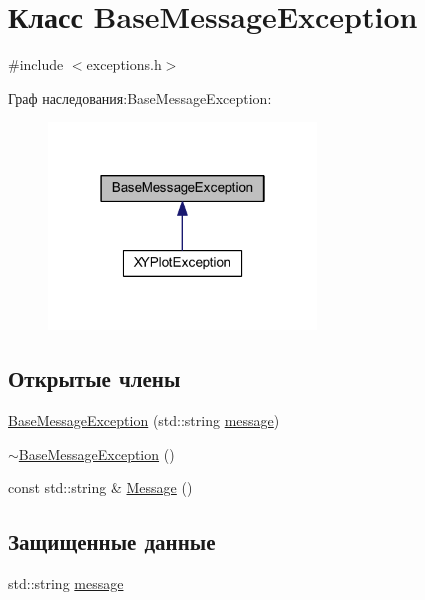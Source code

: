 \hypertarget{class_base_message_exception}{\section{Класс Base\-Message\-Exception}
\label{class_base_message_exception}
}


{\ttfamily \#include $<$exceptions.\-h$>$}



Граф наследования\-:Base\-Message\-Exception\-:
\nopagebreak
\begin{figure}[H]
\begin{center}
\leavevmode
\includegraphics[width=202pt]{class_base_message_exception__inherit__graph}
\end{center}
\end{figure}
\subsection*{Открытые члены}
\begin{DoxyCompactItemize}
\item 
\hyperlink{class_base_message_exception_a61b9dad6f5b44ac8e3012e8b9af75ddf}{Base\-Message\-Exception} (std\-::string \hyperlink{class_base_message_exception_adbf18cd63b2f9a2bc6b0bbe20ce9da58}{message})
\item 
\hyperlink{class_base_message_exception_a2a9ae53ed316b0148db234f173d9d149}{$\sim$\-Base\-Message\-Exception} ()
\item 
const std\-::string \& \hyperlink{class_base_message_exception_ab9c5fefd3af3b24ac69877947ac6ace3}{Message} ()
\end{DoxyCompactItemize}
\subsection*{Защищенные данные}
\begin{DoxyCompactItemize}
\item 
std\-::string \hyperlink{class_base_message_exception_adbf18cd63b2f9a2bc6b0bbe20ce9da58}{message}
\end{DoxyCompactItemize}


